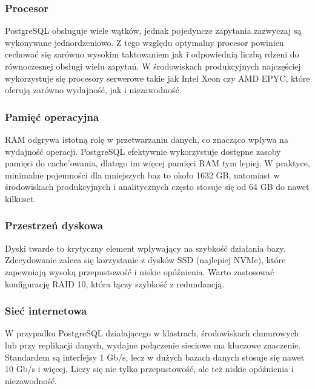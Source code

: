 \documentclass[a4paper,11pt,openany,english]{sphinxmanual}
\begin{document}
\subsubsection{Procesor}
\label{\detokenize{rozdzial2/Sprzet-dla-bazy-danych/source/SprzetDlaBazyDanych:procesor}}
\sphinxAtStartPar
PostgreSQL obsługuje wiele wątków, jednak pojedyncze zapytania zazwyczaj są wykonywane jednordzeniowo. Z tego względu optymalny procesor powinien cechować się zarówno wysokim taktowaniem jak i odpowiednią liczbą rdzeni do równoczesnej obsługi wielu zapytań. W środowiskach produkcyjnych najczęściej wykorzystuje się procesory serwerowe takie jak Intel Xeon czy AMD EPYC, które oferują zarówno wydajność, jak i niezawodność.


\subsubsection{Pamięć operacyjna}
\label{\detokenize{rozdzial2/Sprzet-dla-bazy-danych/source/SprzetDlaBazyDanych:pamiec-operacyjna}}
\sphinxAtStartPar
RAM odgrywa istotną rolę w przetwarzaniu danych, co znacząco wpływa na wydajność operacji. PostgreSQL efektywnie wykorzystuje dostępne zasoby pamięci do cache’owania, dlatego im więcej pamięci RAM tym lepiej. W praktyce, minimalne pojemności dla mniejszych baz to około 16\textendash{}32 GB, natomiast w środowiskach produkcyjnych i analitycznych często stosuje się od 64 GB do nawet kilkuset.


\subsubsection{Przestrzeń dyskowa}
\label{\detokenize{rozdzial2/Sprzet-dla-bazy-danych/source/SprzetDlaBazyDanych:przestrzen-dyskowa}}
\sphinxAtStartPar
Dyski twarde to krytyczny element wpływający na szybkość działania bazy. Zdecydowanie zaleca się korzystanie z dysków SSD (najlepiej NVMe), które zapewniają wysoką przepustowość i niskie opóźnienia. Warto zastosować konfigurację RAID 10, która łączy szybkość z redundancją.


\subsubsection{Sieć internetowa}
\label{\detokenize{rozdzial2/Sprzet-dla-bazy-danych/source/SprzetDlaBazyDanych:siec-internetowa}}
\sphinxAtStartPar
W przypadku PostgreSQL działającego w klastrach, środowiskach chmurowych lub przy replikacji danych, wydajne połączenie sieciowe ma kluczowe znaczenie. Standardem są interfejsy 1 Gb/s, lecz w dużych bazach danych stosuje się nawet 10 Gb/s i więcej. Liczy się nie tylko przepustowość, ale też niskie opóźnienia i niezawodność.
\end{document}
